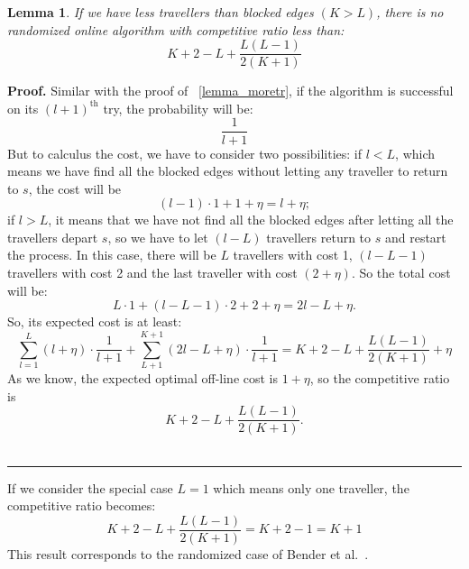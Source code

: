 \documentclass[a4paper, 10pt]{article}
\newtheorem{lemma}{Lemma}
\newenvironment{proof}[1][Proof]{\textbf{#1.} }{\ \rule{0.5em}{0.5em}}
\begin{document}
\begin{lemma}
If we have less travellers than blocked edges $ (K > L )$, there is no randomized online algorithm with competitive ratio less than:
\[
K+2-L+ \frac{L(L-1)}{2(K+1)}
\]
\end{lemma}

\begin{proof}
Similar with the proof of ~\ref{lemma_moretr}, if the algorithm is successful on its $(l+1)^{\text{th}}$ try, the probability will be: 
\[
\frac{1}{l+1}
\]
But to calculus the cost, we have to consider two possibilities: 
if $l < L$, which means we have find all the blocked edges without letting any traveller to return to $s$, the cost will be 
\[
(l-1)\cdot1 + 1 +\eta = l + \eta;
\]
if $l > L$, it means that we have not find all the blocked edges after letting all the travellers depart $s$,  so we have to let $(l-L)$ travellers return to $s$ and restart the process. In this case, there will be $L$ travellers with cost 1, $(l-L-1)$ travellers with cost 2 and the last traveller with cost $(2+\eta)$. So the total cost will be:
\[
L\cdot 1 + (l-L-1)\cdot2 + 2 +\eta = 2l - L + \eta .
\]
So, its expected cost is at least:
\[
\sum_{l=1}^{L}(l+\eta)\cdot \frac{1}{l+1}  +  \sum_{L+1}^{K+1}(2l-L+\eta)\cdot \frac{1}{l+1}
 =K+2-L+ \frac{L(L-1)}{2(K+1)} + \eta
\]
As we know, the expected optimal off-line cost is $1 + \eta$, so the competitive ratio is 
\[
K+2-L+ \frac{L(L-1)}{2(K+1)}.
\]
\end{proof}

If we consider the special case $L=1$ which means only one traveller, the competitive ratio becomes:
\[
K+2-L+ \frac{L(L-1)}{2(K+1)} = K+2-1 = K+1
\]
This result corresponds to the randomized case of Bender et al.~\cite{BeWe15}.



\end{document}
